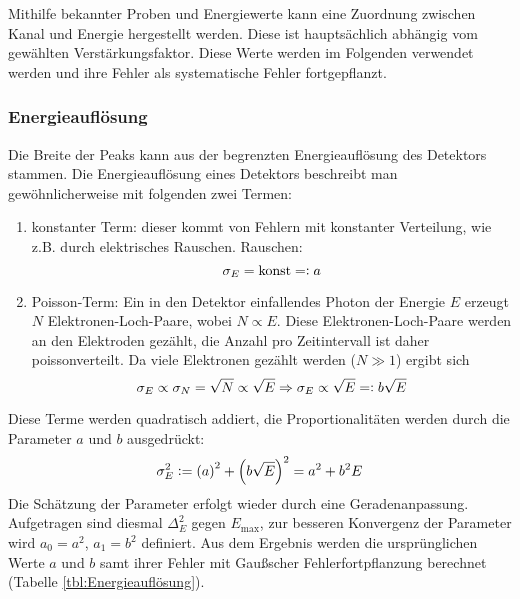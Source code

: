 \documentclass{../Misc/MontavonLaTeX/Montavon}
\newcommand{\defeq}{\vcentcolon=}
\newcommand{\eqdef}{=\vcentcolon}
\begin{document}
Mithilfe bekannter Proben und Energiewerte kann eine Zuordnung zwischen Kanal und Energie hergestellt werden. Diese ist hauptsächlich abhängig vom gewählten Verstärkungsfaktor. 
%
Diese Werte werden im Folgenden verwendet werden und ihre Fehler als systematische Fehler fortgepflanzt.



\subsubsection{Energieauflösung}
Die Breite der Peaks kann aus der begrenzten Energieauflösung des Detektors stammen. 
Die Energieauflösung eines Detektors beschreibt man gewöhnlicherweise mit folgenden zwei Termen:
\begin{enumerate}

\item konstanter Term: dieser kommt von Fehlern mit konstanter Verteilung, wie z.B. durch elektrisches Rauschen. 
Rauschen:
\[
\sigma_E = \textrm{konst} \eqdef a
\]

\item Poisson-Term: Ein in den Detektor einfallendes Photon der Energie $E$ erzeugt $N$ Elektronen-Loch-Paare, wobei $N \propto E$. Diese Elektronen-Loch-Paare werden an den Elektroden gezählt, die Anzahl pro Zeitintervall ist daher poissonverteilt. Da viele Elektronen gezählt werden ($N \gg 1$) ergibt sich 
\[ \sigma_E \propto \sigma_N = \sqrt{N} \propto \sqrt{E} \Rightarrow \sigma_E \propto \sqrt{E} \eqdef b \sqrt{E} \]

\end{enumerate}

Diese Terme werden quadratisch addiert, die Proportionalitäten werden durch die Parameter $a$ und $b$ ausgedrückt:
\[
	\sigma_E^2 \defeq \left(a\right)^2 + \left(b \sqrt{E}\right)^2 = a^2 + b^2 E
\]
Die Schätzung der Parameter erfolgt wieder durch eine Geradenanpassung. Aufgetragen sind diesmal $\Delta_E^2$ gegen $E_\textrm{max}$, zur besseren Konvergenz der Parameter wird $a_0 = a^2$, $a_1 = b^2$ definiert. Aus dem Ergebnis werden die ursprünglichen Werte $a$ und $b$ samt ihrer Fehler mit Gaußscher Fehlerfortpflanzung berechnet (Tabelle \ref{tbl:Energieauflösung}).
\end{document}
